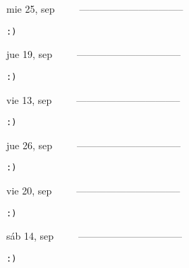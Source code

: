 \documentclass[letterpaper,10pt]{article}
\begin{document}
\begin{multicols}{3}
{mie 25, sep\ \ \ \ \ --------------------------------}
\begin{flushright}\begin{small}\texttt{:)}\end{small}\end{flushright}
\vfill
{jue 19, sep\ \ \ \ \ --------------------------------}
\begin{flushright}\begin{small}\texttt{:)}\end{small}\end{flushright}\par
\vfill
{vie 13, sep\ \ \ \ \ --------------------------------}
\begin{flushright}\begin{small}\texttt{:)}\end{small}\end{flushright}\par
\vfill
\end{multicols}
\vspace{1.05cm}

\begin{multicols}{3}
{jue 26, sep\ \ \ \ \ --------------------------------}
\begin{flushright}\begin{small}\texttt{:)}\end{small}\end{flushright}
\vfill
{vie 20, sep\ \ \ \ \ --------------------------------}
\begin{flushright}\begin{small}\texttt{:)}\end{small}\end{flushright}\par
\vfill
{sáb 14, sep\ \ \ \ \ --------------------------------}
\begin{flushright}\begin{small}\texttt{:)}\end{small}\end{flushright}\par
\vfill
\end{multicols}
\vspace{1.05cm}
\end{document}
